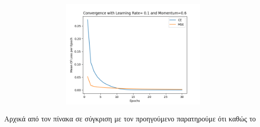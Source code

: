 \documentclass[12pt,a4paper]{article}
\begin{document}
        \begin{figure}[h]
            \raggedright
            \begin{subfigure}[t]{0.5\textwidth}
               \includegraphics[width=10cm,height=5.2cm,left]{images/0.1_0.6.png}
            \end{subfigure}
        \end{figure}
        Αρχικά από τον πίνακα σε σύγκριση με τον προηγούμενο παρατηρούμε ότι καθώς το
\end{document}
